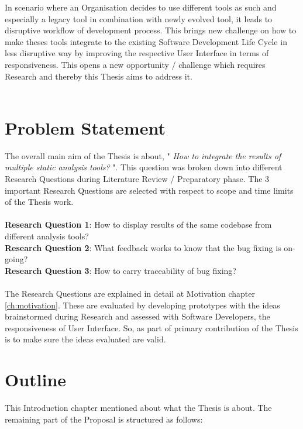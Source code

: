 In scenario where an Organisation decides to use different tools as such and especially a legacy tool in combination with newly evolved tool, it leads to disruptive workflow of development process. This brings new challenge on how to make theses tools integrate to the existing Software Development Life Cycle in less disruptive way by improving the respective User Interface in terms of responsiveness. This opens a new opportunity / challenge which requires Research and thereby this Thesis aims to address it.
\\ \\

\section{Problem Statement}

The overall main aim of the Thesis is about, " \textit{How to integrate the results of multiple static analysis tools?} ". This question was broken down into different Research Questions during Literature Review / Preparatory phase. The 3 important Research Questions are selected with respect to scope and time limits of the Thesis work. \\ \\

\noindent\textbf{Research Question 1}: How to display results of the same codebase from different analysis tools? \\
\textbf{Research Question 2}: What feedback works to know that the bug fixing is on-going? \\
\textbf{Research Question 3}: How to carry traceability of bug fixing? \\ \\

The Research Questions are explained in detail at Motivation chapter \ref{ch:motivation}. These are evaluated by developing prototypes with the ideas brainstormed during Research and assessed with Software Developers, the responsiveness of User Interface. So, as part of primary contribution of the Thesis is to make sure the ideas evaluated are valid.

\section{Outline}

This Introduction chapter mentioned about what the Thesis is about. The remaining part of the Proposal is structured as follows: \\ \\

